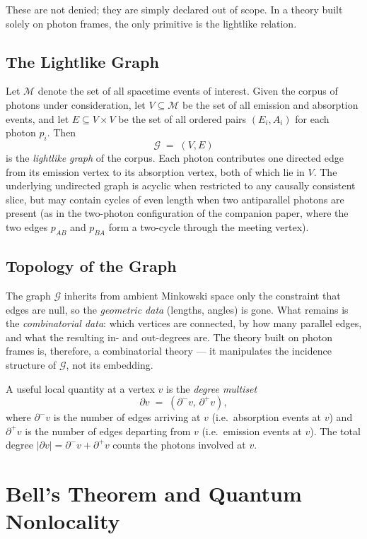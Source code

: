 \documentclass[11pt]{article}
\begin{document}
These are not denied; they are simply declared out of scope. In a theory built solely on photon frames, the only primitive is the lightlike relation.

\subsection{The Lightlike Graph}

Let $\mathcal{M}$ denote the set of all spacetime events of interest. Given the corpus of photons under consideration, let $V \subseteq \mathcal{M}$ be the set of all emission and absorption events, and let $E \subseteq V \times V$ be the set of all ordered pairs $(E_i, A_i)$ for each photon $p_i$. Then
\[
\mathcal{G} \;=\; (V, E)
\]
is the \emph{lightlike graph} of the corpus. Each photon contributes one directed edge from its emission vertex to its absorption vertex, both of which lie in $V$. The underlying undirected graph is acyclic when restricted to any causally consistent slice, but may contain cycles of even length when two antiparallel photons are present (as in the two-photon configuration of the companion paper, where the two edges $p_{AB}$ and $p_{BA}$ form a two-cycle through the meeting vertex).

\subsection{Topology of the Graph}

The graph $\mathcal{G}$ inherits from ambient Minkowski space only the constraint that edges are null, so the \emph{geometric data} (lengths, angles) is gone. What remains is the \emph{combinatorial data}: which vertices are connected, by how many parallel edges, and what the resulting in- and out-degrees are. The theory built on photon frames is, therefore, a combinatorial theory --- it manipulates the incidence structure of $\mathcal{G}$, not its embedding.

A useful local quantity at a vertex $v$ is the \emph{degree multiset}
\[
\partial v \;=\; (\partial^- v, \, \partial^+ v),
\]
where $\partial^- v$ is the number of edges arriving at $v$ (i.e.\ absorption events at $v$) and $\partial^+ v$ is the number of edges departing from $v$ (i.e.\ emission events at $v$). The total degree $|\partial v| = \partial^- v + \partial^+ v$ counts the photons involved at $v$.

\section{Bell's Theorem and Quantum Nonlocality}
\label{sec:bell}
\end{document}
